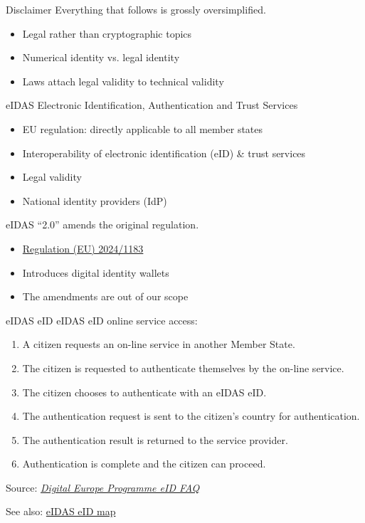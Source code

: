 \begin{frame}{Disclaimer}
  Everything that follows is grossly oversimplified.
  \pause
  \begin{itemize}
    \item Legal rather than cryptographic topics
    \item Numerical identity vs. legal identity
    \item Laws attach legal validity to technical validity
  \end{itemize}
\end{frame}

\begin{frame}{eIDAS}
  Electronic Identification, Authentication and Trust Services
  \begin{itemize}[<+(1)->]
    \item EU regulation: directly applicable to all member states
    \item Interoperability of electronic identification (eID) \& trust services
    \item Legal validity
    \item National identity providers (IdP)
  \end{itemize}

  \vfill

  \pause
  eIDAS \enquote{2.0} amends the original regulation.
  \begin{itemize}[<+(1)->]
    \item \href{https://eur-lex.europa.eu/eli/reg/2024/1183/oj}{Regulation (EU) 2024/1183}
    \item Introduces digital identity wallets
    \item The amendments are out of our scope
  \end{itemize}
\end{frame}

\begin{frame}{eIDAS eID}
  eIDAS eID online service access:
  \begin{enumerate}[<+(1)->]
    \item A citizen requests an on-line service in another Member State.
    \item The citizen is requested to authenticate themselves by the on-line service.
    \item The citizen chooses to authenticate with an eIDAS eID.
    \item The authentication request is sent to the citizen's country for authentication.
    \item The authentication result is returned to the service provider.
    \item Authentication is complete and the citizen can proceed.
  \end{enumerate}

  \pause
  {\scriptsize Source: \href{https://ec.europa.eu/digital-building-blocks/sites/display/DIGITAL/eID}{\textit{Digital Europe Programme eID FAQ}}}

  \pause
  See also: \href{https://www.eid.as/tsp-map/}{eIDAS eID map}
\end{frame}

